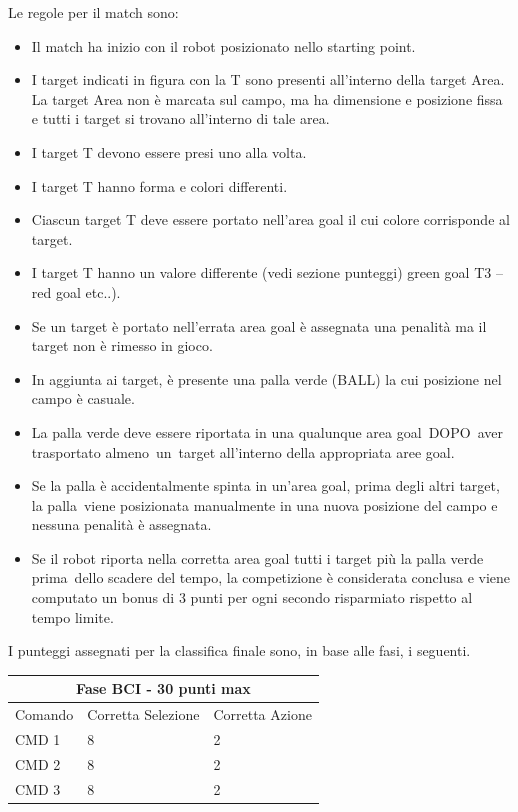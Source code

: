 \documentclass[a4paper,12pt,italian]{article}
\begin{document}
Le regole per il match sono:
\begin{itemize}
	\item Il match ha inizio con il robot posizionato nello starting point.
	\item I target indicati in figura con la T sono presenti all’interno della target Area. La target Area non è marcata sul campo, ma ha dimensione e posizione fissa e tutti i target si trovano all’interno di tale area.
	\item I target T devono essere presi uno alla volta.
	\item I target T hanno forma e colori differenti.
	\item Ciascun target T deve essere portato nell’area goal il cui colore corrisponde al target. 
	\item I target T hanno un valore differente (vedi sezione punteggi) green goal T3 – red goal etc..).
	\item Se un target è portato nell’errata area goal è assegnata una penalità ma il target non è rimesso in gioco.
	\item In aggiunta ai target, è presente una palla verde (BALL) la cui posizione nel campo è casuale.
	\item La palla verde deve essere riportata in una qualunque area goal DOPO aver trasportato almeno un target all’interno della appropriata aree goal.
	\item Se la palla è accidentalmente spinta in un’area goal, prima degli altri target, la palla viene posizionata manualmente in una nuova posizione del campo e nessuna penalità è assegnata.
	\item Se il robot riporta nella corretta area goal tutti i target più la palla verde prima dello scadere del tempo, la competizione è considerata conclusa e viene computato un bonus di 3 punti per ogni secondo risparmiato rispetto al tempo limite.
\end{itemize}

I punteggi assegnati per la classifica finale sono, in base alle fasi, i seguenti.

\begin{center}
	\begin{tabular}{ |p{3cm}||p{4cm}|p{3cm}| }
 		\hline
 		\multicolumn{3}{|c|}{Fase BCI - 30 punti max} \\
 		\hline
 		Comando & Corretta Selezione & Corretta Azione \\
 		\hline
		 CMD 1 & 8 & 2\\
 		 CMD 2 & 8 & 2\\
 		 CMD 3 & 8 & 2\\
		\hline
	\end{tabular}
\end{center}
\end{document}
